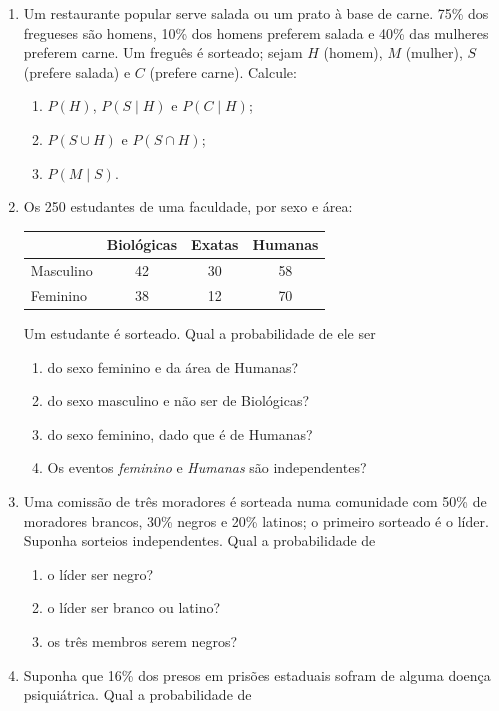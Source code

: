 \documentclass[11pt]{article}
\begin{document}
\begin{enumerate}[label=\textbf{C\arabic*.}, leftmargin=*]
\item Um restaurante popular serve salada ou um prato à base de carne. 75\% dos fregueses são homens, 10\% dos homens preferem salada e 40\% das mulheres preferem carne. Um freguês é sorteado; sejam $H$ (homem), $M$ (mulher), $S$ (prefere salada) e $C$ (prefere carne). Calcule:
\begin{enumerate}[label=(\alph*)]
  \item $P(H)$, $P(S \mid H)$ e $P(C \mid H)$;
  \item $P(S \cup H)$ e $P(S \cap H)$;
  \item $P(M \mid S)$.
\end{enumerate}
\item Os 250 estudantes de uma faculdade, por sexo e área:
\begin{center}
\begin{tabular}{l|ccc}
\toprule
 & Biológicas & Exatas & Humanas \\
\midrule
Masculino & 42 & 30 & 58 \\
Feminino & 38 & 12 & 70 \\
\bottomrule
\end{tabular}
\end{center}
Um estudante é sorteado. Qual a probabilidade de ele ser
\begin{enumerate}[label=(\alph*)]
  \item do sexo feminino e da área de Humanas?
  \item do sexo masculino e não ser de Biológicas?
  \item do sexo feminino, dado que é de Humanas?
  \item Os eventos \emph{feminino} e \emph{Humanas} são independentes?
\end{enumerate}
\item Uma comissão de três moradores é sorteada numa comunidade com 50\% de moradores brancos, 30\% negros e 20\% latinos; o primeiro sorteado é o líder. Suponha sorteios independentes. Qual a probabilidade de
\begin{enumerate}[label=(\alph*)]
  \item o líder ser negro?
  \item o líder ser branco ou latino?
  \item os três membros serem negros?
\end{enumerate}
\item Suponha que 16\% dos presos em prisões estaduais sofram de alguma doença psiquiátrica. Qual a probabilidade de

\end{enumerate}
\end{document}
